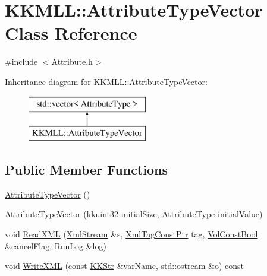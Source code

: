 \hypertarget{class_k_k_m_l_l_1_1_attribute_type_vector}{}\section{K\+K\+M\+LL\+:\+:Attribute\+Type\+Vector Class Reference}
\label{class_k_k_m_l_l_1_1_attribute_type_vector}


{\ttfamily \#include $<$Attribute.\+h$>$}

Inheritance diagram for K\+K\+M\+LL\+:\+:Attribute\+Type\+Vector\+:\begin{figure}[H]
\begin{center}
\leavevmode
\includegraphics[height=2.000000cm]{class_k_k_m_l_l_1_1_attribute_type_vector}
\end{center}
\end{figure}
\subsection*{Public Member Functions}
\begin{DoxyCompactItemize}
\item 
\hyperlink{class_k_k_m_l_l_1_1_attribute_type_vector_a6d8bac73ba838175206abbd339ce6cbf}{Attribute\+Type\+Vector} ()
\item 
\hyperlink{class_k_k_m_l_l_1_1_attribute_type_vector_acff66c7836df0bb31e9eeb18a9027e9f}{Attribute\+Type\+Vector} (\hyperlink{namespace_k_k_b_af8d832f05c54994a1cce25bd5743e19a}{kkuint32} initial\+Size, \hyperlink{namespace_k_k_m_l_l_a99973706982b59debba670e2480555ab}{Attribute\+Type} initial\+Value)
\item 
void \hyperlink{class_k_k_m_l_l_1_1_attribute_type_vector_a738cb10940dc3d22ea269ba4670ca1bf}{Read\+X\+ML} (\hyperlink{class_k_k_b_1_1_xml_stream}{Xml\+Stream} \&s, \hyperlink{namespace_k_k_b_a5f1b0b1667d79fec26deeff10c43df23}{Xml\+Tag\+Const\+Ptr} tag, \hyperlink{namespace_k_k_b_a7d390f568e2831fb76b86b56c87bf92f}{Vol\+Const\+Bool} \&cancel\+Flag, \hyperlink{class_k_k_b_1_1_run_log}{Run\+Log} \&log)
\item 
void \hyperlink{class_k_k_m_l_l_1_1_attribute_type_vector_a160fa7813660e0df227fe67201bfbcd4}{Write\+X\+ML} (const \hyperlink{class_k_k_b_1_1_k_k_str}{K\+K\+Str} \&var\+Name, std\+::ostream \&o) const 
\end{DoxyCompactItemize}


